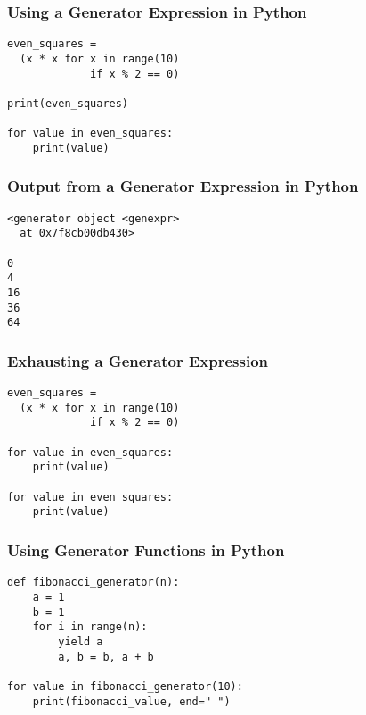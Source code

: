 \documentclass[14pt,aspectratio=169]{beamer}
\begin{document}
%
\begin{frame}[fragile]
  \frametitle{Using a Generator Expression in Python}
  \normalsize
  \begin{minipage}{6in}
    \vspace*{.2in}
    \begin{verbatim}
even_squares =
  (x * x for x in range(10)
             if x % 2 == 0)

print(even_squares)

for value in even_squares:
    print(value)
    \end{verbatim}
  \end{minipage}
\end{frame}

%
\begin{frame}[fragile]
  \frametitle{Output from a Generator Expression in Python}
  \normalsize
  \hspace*{.1in}
  \begin{minipage}{6in}
    \vspace*{.2in}
    \begin{verbatim}
<generator object <genexpr>
  at 0x7f8cb00db430>

0
4
16
36
64
    \end{verbatim}
  \end{minipage}
\end{frame}

%
\begin{frame}[fragile]
  \frametitle{Exhausting a Generator Expression}
  \normalsize
  \begin{minipage}{6in}
    \vspace*{.2in}
    \begin{verbatim}
even_squares =
  (x * x for x in range(10)
             if x % 2 == 0)

for value in even_squares:
    print(value)

for value in even_squares:
    print(value)
    \end{verbatim}
  \end{minipage}
\end{frame}

%
\begin{frame}[fragile]
  \frametitle{Using Generator Functions in Python}
  \normalsize
  \begin{minipage}{6in}
    \vspace*{.1in}
    \begin{verbatim}
def fibonacci_generator(n):
    a = 1
    b = 1
    for i in range(n):
        yield a
        a, b = b, a + b

for value in fibonacci_generator(10):
    print(fibonacci_value, end=" ")
    \end{verbatim}
  \end{minipage}
\end{frame}
\end{document}

